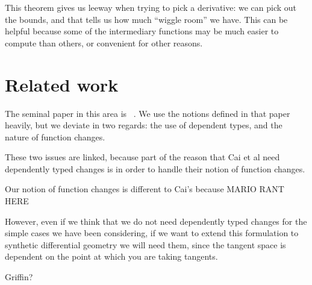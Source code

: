 \documentclass[english]{article}
\theoremstyle{plain}
\theoremstyle{definition}
\theoremstyle{remark}
\theoremstyle{remark}
\theoremstyle{remark}
\theoremstyle{definition}
\begin{document}
This theorem gives us leeway when trying to pick a derivative: we can pick out the
bounds, and that tells us how much ``wiggle room'' we have. This can be helpful
because some of the intermediary functions may be much easier to compute than
others, or convenient for other reasons.

\section{Related work}

The seminal paper in this area is ~\cite{cai2014changes}. We use the notions
defined in that paper heavily, but we deviate in two regards: the use of
dependent types, and the nature of function changes.

These two issues are linked, because part of the reason that Cai et al need
dependently typed changes is in order to handle their notion of function
changes.

Our notion of function changes is different to Cai's because MARIO RANT HERE

However, even if we think that we do not need dependently typed changes for the
simple cases we have been considering, if we want to extend this formulation to
synthetic differential geometry we will need them, since the tangent space is
dependent on the point at which you are taking tangents.

Griffin?



\end{document}
